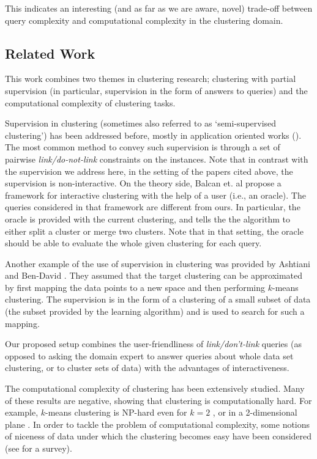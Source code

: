 \documentclass{article}
\begin{document}
This indicates an interesting (and as far as we are aware, novel) trade-off between query complexity and computational complexity in the clustering domain. 


\subsection{Related Work}
This work combines two themes in clustering research; clustering with partial supervision
(in particular, supervision in the form of answers to queries) and the computational complexity of clustering tasks.

Supervision in clustering (sometimes also referred to as `semi-supervised clustering') has been addressed before, mostly in application oriented works (\cite{basu2002semi,basu2004probabilistic, kulis2009semi}). The most common method to convey such supervision is through a set of pairwise \emph{link/do-not-link} constraints on the instances. Note that in contrast with the supervision we address here, in the setting of the papers cited above, the supervision is non-interactive. On the theory side, Balcan et. al \cite{balcan2008clustering} propose a framework for interactive clustering with the help of a user (i.e., an oracle). The queries considered in that framework are different from ours. In particular, the oracle is provided with the current clustering, and tells the the algorithm to either split a cluster or merge two clusters. Note that in that setting, the oracle should be able to evaluate the whole given clustering for each query.

Another example of the use of supervision in clustering was provided by Ashtiani and Ben-David \cite{ashtiani2015representation}. They assumed that the target clustering can be approximated by first mapping the data points to a new space and then performing $k$-means clustering. The supervision is in the form of a clustering of a small subset of data (the subset provided by the learning algorithm) and is used to search for such a mapping.

Our proposed setup combines the user-friendliness of \emph{link/don't-link} queries (as opposed to asking the domain expert to answer queries about whole data set clustering, or to cluster sets of data) with the advantages of interactiveness. 

The computational complexity of clustering has been extensively studied. Many of these results are negative, showing that clustering is computationally hard. For example, $k$-means clustering is NP-hard even for $k=2$ \cite{dasgupta2008hardness}, or in a 2-dimensional plane \cite{vattani2009hardness,mahajan2009planar}. In order to tackle the problem of computational complexity, some notions of niceness of data under which the clustering becomes easy have been considered (see \cite{Ben-David15} for a survey).
\end{document}
